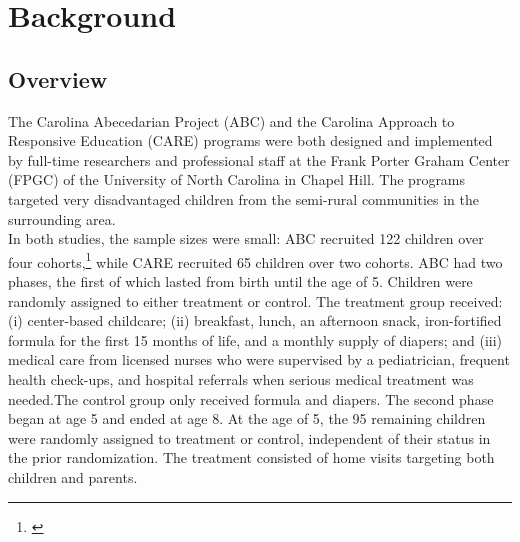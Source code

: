 \singlespacing
\pagebreak
\tableofcontents
\listoffigures
\listoftables
\pagebreak

\section{Background} \label{section:bakcground}
\subsection{Overview}

\noindent The Carolina Abecedarian Project (ABC) and the Carolina Approach to Responsive Education (CARE) programs were both designed and implemented by full-time researchers and professional staff at the Frank Porter Graham Center (FPGC) of the University of North Carolina in Chapel Hill. The programs targeted very disadvantaged children from the semi-rural communities in the surrounding area.\\

\noindent In both studies, the sample sizes were small: ABC recruited 122 children over four cohorts,\footnote{\citet{Ramey_Collier_etal_1976_CarolinaAbecedarianProject}} while CARE recruited 65 children over two cohorts. ABC had two phases, the first of which lasted from birth until the age of 5. Children were randomly assigned to either treatment or control. The treatment group received: (i) center-based childcare; (ii) breakfast, lunch, an afternoon snack, iron-fortified formula for the first 15 months of life, and a monthly supply of diapers; and (iii) medical care from licensed nurses who were supervised by a pediatrician, frequent health check-ups, and hospital referrals when serious medical treatment was needed.The control group only received formula and diapers. The second phase began at age 5 and ended at age 8. At the age of 5, the 95 remaining children were randomly assigned to treatment or control, independent of their status in the prior randomization. The treatment consisted of home visits targeting both children and parents.\\ 

